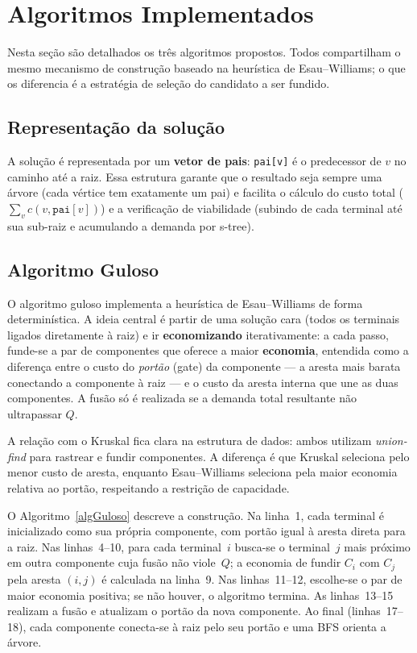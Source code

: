 \documentclass[12pt]{article}
\begin{document}
\section{Algoritmos Implementados}
\label{secAlgoritmos}

Nesta seção são detalhados os três algoritmos propostos. Todos compartilham o mesmo mecanismo de construção baseado na heurística de Esau--Williams; o que os diferencia é a estratégia de seleção do candidato a ser fundido.

\subsection{Representação da solução}

A solução é representada por um \textbf{vetor de pais}: \texttt{pai[v]} é o predecessor de $v$ no caminho até a raiz. Essa estrutura garante que o resultado seja sempre uma árvore (cada vértice tem exatamente um pai) e facilita o cálculo do custo total ($\sum_v c(v, \texttt{pai}[v])$) e a verificação de viabilidade (subindo de cada terminal até sua sub-raiz e acumulando a demanda por s-tree).

\subsection{Algoritmo Guloso}
\label{subSecAlgGuloso}

O algoritmo guloso implementa a heurística de Esau--Williams de forma determinística. A ideia central é partir de uma solução cara (todos os terminais ligados diretamente à raiz) e ir \textbf{economizando} iterativamente: a cada passo, funde-se a par de componentes que oferece a maior \textbf{economia}, entendida como a diferença entre o custo do \emph{portão} (gate) da componente --- a aresta mais barata conectando a componente à raiz --- e o custo da aresta interna que une as duas componentes. A fusão só é realizada se a demanda total resultante não ultrapassar $Q$.

A relação com o Kruskal fica clara na estrutura de dados: ambos utilizam \textit{union-find} para rastrear e fundir componentes. A diferença é que Kruskal seleciona pelo menor custo de aresta, enquanto Esau--Williams seleciona pela maior economia relativa ao portão, respeitando a restrição de capacidade.

O Algoritmo~\ref{algGuloso} descreve a construção. Na linha~1, cada terminal é inicializado como sua própria componente, com portão igual à aresta direta para a raiz. Nas linhas~4--10, para cada terminal~$i$ busca-se o terminal~$j$ mais próximo em outra componente cuja fusão não viole~$Q$; a economia de fundir $C_i$ com $C_j$ pela aresta $(i,j)$ é calculada na linha~9. Nas linhas~11--12, escolhe-se o par de maior economia positiva; se não houver, o algoritmo termina. As linhas~13--15 realizam a fusão e atualizam o portão da nova componente. Ao final (linhas~17--18), cada componente conecta-se à raiz pelo seu portão e uma BFS orienta a árvore.
\end{document}
